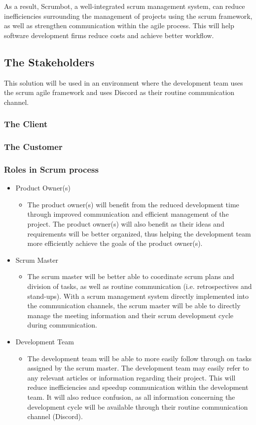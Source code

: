 \documentclass[12pt, titlepage]{article}
\begin{document}
As a result, Scrumbot, a well-integrated scrum management system, can reduce inefficiencies surrounding the management of projects using the scrum framework, as well as strengthen communication within the agile process. This will help software development firms reduce costs and achieve better workflow.

\subsection{The Stakeholders}
This solution will be used in an environment where the development team uses the scrum agile framework and uses Discord as their routine communication channel.
\subsubsection{The Client}
\subsubsection{The Customer}
\subsubsection{Roles in Scrum process}
\begin{itemize}
    \item Product Owner(s)
    \begin{itemize}
      \item[] The product owner(s) will benefit from the reduced development time through improved communication and efficient management of the project. The product owner(s) will also benefit as their ideas and requirements will be better organized, thus helping the development team more efficiently achieve the goals of the product owner(s).
    \end{itemize}
    \item Scrum Master
    \begin{itemize}
      \item[] The scrum master will be better able to coordinate scrum plans and division of tasks, as well as routine communication (i.e. retrospectives and stand-ups). With a scrum management system directly implemented into the communication channels, the scrum master will be able to directly manage the meeting information and their scrum development cycle during communication.
    \end{itemize}
    \item Development Team
    \begin{itemize}
      \item[] The development team will be able to more easily follow through on tasks assigned by the scrum master. The development team may easily refer to any relevant articles or information regarding their project. This will reduce inefficiencies and speedup communication within the development team. It will also reduce confusion, as all information concerning the development cycle will be available through their routine communication channel (Discord).
    \end{itemize}
\end{itemize}
\end{document}
